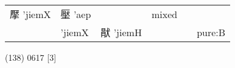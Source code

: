 \documentclass[14pt,a4paper]{scrartcl}
\begin{document}
\begin{longtable}[c]{@{}llllll@{}}
\begin{minipage}[t]{0.14\columnwidth}
擪 'jiemX
\strut\end{minipage} &
\begin{minipage}[t]{0.14\columnwidth}\raggedright\strut
壓 'aep
\strut\end{minipage} &
\begin{minipage}[t]{0.14\columnwidth}\raggedright\strut
\strut\end{minipage} &
\begin{minipage}[t]{0.14\columnwidth}\raggedright\strut
mixed
\strut\end{minipage}\tabularnewline
\begin{minipage}[t]{0.14\columnwidth}\raggedright\strut
𤡜
\strut\end{minipage} &
\begin{minipage}[t]{0.14\columnwidth}\raggedright\strut
'jiemX
\strut\end{minipage} &
\begin{minipage}[t]{0.14\columnwidth}\raggedright\strut
猒 'jiemH
\strut\end{minipage} &
\begin{minipage}[t]{0.14\columnwidth}\raggedright\strut
\strut\end{minipage} &
\begin{minipage}[t]{0.14\columnwidth}\raggedright\strut
\strut\end{minipage} &
\begin{minipage}[t]{0.14\columnwidth}\raggedright\strut
pure:B
\strut\end{minipage}\tabularnewline
\bottomrule
\end{longtable}

(138) 0617 {[}3{]}
\end{document}
